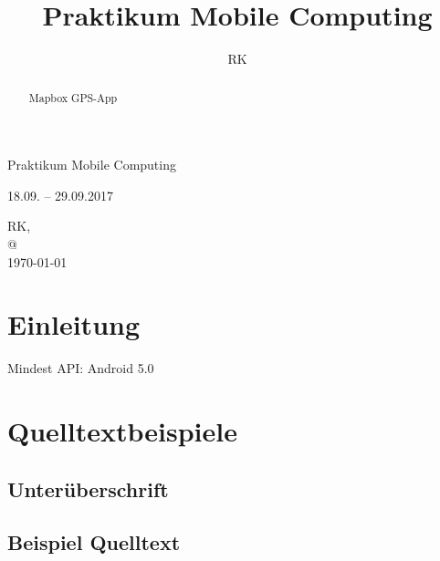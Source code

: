 \documentclass[a4paper, 10pt]{scrartcl}
\title{Praktikum Mobile Computing}
\author{RK}		%
\begin{document}
\begin{titlepage}
   
   \begin{center}
   \vspace*{4cm}
      \huge{Praktikum Mobile Computing}\\
      \vspace{1cm}
      
      \Large{18.09. – 29.09.2017}
      
      \vfill
      \Large{RK, }\\		%
      \large{@}\\	%
      \vspace{1cm}
      \today
      
      \vspace*{2cm}
      
      
   \end{center}
   
\end{titlepage}

\tableofcontents

\newpage

\begin{abstract}
Mapbox GPS-App
\end{abstract}

\newpage

\section{Einleitung}

Mindest API: Android 5.0 

\section{Quelltextbeispiele}

\subsection{Unterüberschrift}

\subsection{Beispiel Quelltext}
\end{document}
